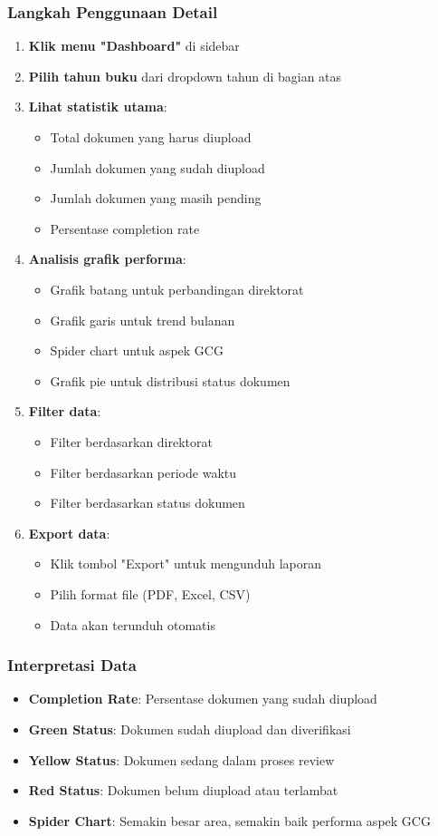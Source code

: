 \documentclass[12pt,a4paper]{article}
\begin{document}
\subsubsection{Langkah Penggunaan Detail}
\begin{enumerate}
\item \textbf{Klik menu "Dashboard"} di sidebar
\item \textbf{Pilih tahun buku} dari dropdown tahun di bagian atas
\item \textbf{Lihat statistik utama}:
\begin{itemize}
\item Total dokumen yang harus diupload
\item Jumlah dokumen yang sudah diupload
\item Jumlah dokumen yang masih pending
\item Persentase completion rate
\end{itemize}
\item \textbf{Analisis grafik performa}:
\begin{itemize}
\item Grafik batang untuk perbandingan direktorat
\item Grafik garis untuk trend bulanan
\item Spider chart untuk aspek GCG
\item Grafik pie untuk distribusi status dokumen
\end{itemize}
\item \textbf{Filter data}:
\begin{itemize}
\item Filter berdasarkan direktorat
\item Filter berdasarkan periode waktu
\item Filter berdasarkan status dokumen
\end{itemize}
\item \textbf{Export data}:
\begin{itemize}
\item Klik tombol "Export" untuk mengunduh laporan
\item Pilih format file (PDF, Excel, CSV)
\item Data akan terunduh otomatis
\end{itemize}
\end{enumerate}

\subsubsection{Interpretasi Data}
\begin{itemize}
\item \textbf{Completion Rate}: Persentase dokumen yang sudah diupload
\item \textbf{Green Status}: Dokumen sudah diupload dan diverifikasi
\item \textbf{Yellow Status}: Dokumen sedang dalam proses review
\item \textbf{Red Status}: Dokumen belum diupload atau terlambat
\item \textbf{Spider Chart}: Semakin besar area, semakin baik performa aspek GCG
\end{itemize}
\end{document}
